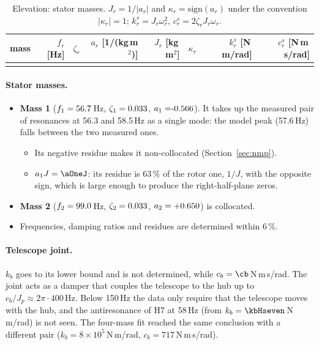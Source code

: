 \documentclass[10pt,a4paper]{article}
\numberwithin{equation}{section}
\begin{document}
\begin{table}[H]\centering\small
\caption{Elevation: stator masses. $J_r=1/|a_r|$ and $\kappa_r=\mathrm{sign}(a_r)$ under the convention $|\kappa_r|=1$; $k_r^s=J_r\omega_r^2$, $c_r^s=2\zeta_rJ_r\omega_r$.}\label{tab:masses}
\begin{tabular}{lrrrrrrr}\toprule
mass & $f_r$ [Hz] & $\zeta_r$ & $a_r$ [1/(kg\,m$^2$)] & $J_r$ [kg\,m$^2$] & $\kappa_r$ & $k_r^s$ [N\,m/rad] & $c_r^s$ [N\,m\,s/rad] \\ \midrule
\\ \bottomrule
\end{tabular}\end{table}

\paragraph{Stator masses.}
\begin{itemize}
\item \textbf{Mass 1} ($f_1=56.7$\,Hz, $\zeta_1=0.033$, $a_1=\aMassI$). It takes up the measured pair of resonances at 56.3 and 58.5\,Hz as a single mode: the model peak (57.6\,Hz) falls between the two measured ones.
  \begin{itemize}
  \item Its negative residue makes it non-collocated (Section~\ref{sec:nmp}).
  \item $a_1J=\aOneJ$: its residue is 63\,\% of the rotor one, $1/J$, with the opposite sign, which is large enough to produce the right-half-plane zeros.
  \end{itemize}
\item \textbf{Mass 2} ($f_2=99.0$\,Hz, $\zeta_2=0.033$, $a_2=+0.650$) is collocated.
\item Frequencies, damping ratios and residues are determined within 6\,\%.
\end{itemize}

\paragraph{Telescope joint.} $k_b$ goes to its lower bound and is not determined, while $c_b=\cb$\,N\,m\,s/rad. The joint acts as a damper that couples the telescope to the hub up to $c_b/J_p\approx2\pi\cdot400$\,Hz. Below 150\,Hz the data only require that the telescope moves with the hub, and the antiresonance of H7 at 58\,Hz (from $k_b=\kbHseven$\,N\,m/rad) is not seen. The four-mass fit reached the same conclusion with a different pair ($k_b=8\times10^5$\,N\,m/rad, $c_b=717$\,N\,m\,s/rad).
\end{document}
